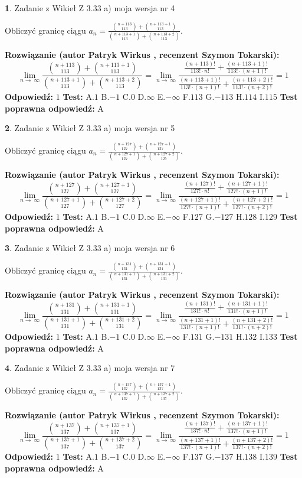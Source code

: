 \documentclass[12pt, a4paper]{article}
\theoremstyle{definition} %
\newtheorem{zad}{}
\newcommand{\zadStart}[1]{\begin{zad}#1\newline}
\newcommand{\zadStop}{\end{zad}}
\newcommand{\rozwStart}[2]{\noindent \textbf{Rozwiązanie (autor #1 , recenzent #2): }\newline}
\newcommand{\rozwStop}{\newline}
\newcommand{\odpStart}{\noindent \textbf{Odpowiedź:}\newline}
\newcommand{\odpStop}{\newline}
\newcommand{\testStart}{\noindent \textbf{Test:}\newline}
\newcommand{\testStop}{\newline}
\newcommand{\kluczStart}{\noindent \textbf{Test poprawna odpowiedź:}\newline}
\newcommand{\kluczStop}{\newline}
\begin{document}
\zadStart{Zadanie z Wikieł Z 3.33 a) moja wersja nr 4}

Obliczyć granicę ciągu $a_{n}=\frac{{n+113\choose113}+{n+113+1\choose113}}{{n+113+1\choose113}+{n+113+2\choose113}}$.
\zadStop
\rozwStart{Patryk Wirkus}{Szymon Tokarski}
$$\lim\limits_{n\to\ \infty}\frac{{n+113\choose113}+{n+113+1\choose113}}{{n+113+1\choose113}+{n+113+2\choose113}} = \lim\limits_{n\to\ \infty}\frac{\frac{(n+113)!}{113! \cdot n!}+\frac{(n+113+1)!}{113! \cdot (n+1)!}}{\frac{(n+113+1)!}{113! \cdot (n+1)!}+\frac{(n+113+2)!}{113! \cdot (n+2)!}} = 1$$
\rozwStop
\odpStart
$1$
\odpStop
\testStart
A.$1$ B.$-1$ C.$0$ D.$\infty$ E.$-\infty$
F.$113$ G.$-113$
H.$114$
I.$115$
\testStop
\kluczStart
A
\kluczStop



\zadStart{Zadanie z Wikieł Z 3.33 a) moja wersja nr 5}

Obliczyć granicę ciągu $a_{n}=\frac{{n+127\choose127}+{n+127+1\choose127}}{{n+127+1\choose127}+{n+127+2\choose127}}$.
\zadStop
\rozwStart{Patryk Wirkus}{Szymon Tokarski}
$$\lim\limits_{n\to\ \infty}\frac{{n+127\choose127}+{n+127+1\choose127}}{{n+127+1\choose127}+{n+127+2\choose127}} = \lim\limits_{n\to\ \infty}\frac{\frac{(n+127)!}{127! \cdot n!}+\frac{(n+127+1)!}{127! \cdot (n+1)!}}{\frac{(n+127+1)!}{127! \cdot (n+1)!}+\frac{(n+127+2)!}{127! \cdot (n+2)!}} = 1$$
\rozwStop
\odpStart
$1$
\odpStop
\testStart
A.$1$ B.$-1$ C.$0$ D.$\infty$ E.$-\infty$
F.$127$ G.$-127$
H.$128$
I.$129$
\testStop
\kluczStart
A
\kluczStop



\zadStart{Zadanie z Wikieł Z 3.33 a) moja wersja nr 6}

Obliczyć granicę ciągu $a_{n}=\frac{{n+131\choose131}+{n+131+1\choose131}}{{n+131+1\choose131}+{n+131+2\choose131}}$.
\zadStop
\rozwStart{Patryk Wirkus}{Szymon Tokarski}
$$\lim\limits_{n\to\ \infty}\frac{{n+131\choose131}+{n+131+1\choose131}}{{n+131+1\choose131}+{n+131+2\choose131}} = \lim\limits_{n\to\ \infty}\frac{\frac{(n+131)!}{131! \cdot n!}+\frac{(n+131+1)!}{131! \cdot (n+1)!}}{\frac{(n+131+1)!}{131! \cdot (n+1)!}+\frac{(n+131+2)!}{131! \cdot (n+2)!}} = 1$$
\rozwStop
\odpStart
$1$
\odpStop
\testStart
A.$1$ B.$-1$ C.$0$ D.$\infty$ E.$-\infty$
F.$131$ G.$-131$
H.$132$
I.$133$
\testStop
\kluczStart
A
\kluczStop



\zadStart{Zadanie z Wikieł Z 3.33 a) moja wersja nr 7}

Obliczyć granicę ciągu $a_{n}=\frac{{n+137\choose137}+{n+137+1\choose137}}{{n+137+1\choose137}+{n+137+2\choose137}}$.
\zadStop
\rozwStart{Patryk Wirkus}{Szymon Tokarski}
$$\lim\limits_{n\to\ \infty}\frac{{n+137\choose137}+{n+137+1\choose137}}{{n+137+1\choose137}+{n+137+2\choose137}} = \lim\limits_{n\to\ \infty}\frac{\frac{(n+137)!}{137! \cdot n!}+\frac{(n+137+1)!}{137! \cdot (n+1)!}}{\frac{(n+137+1)!}{137! \cdot (n+1)!}+\frac{(n+137+2)!}{137! \cdot (n+2)!}} = 1$$
\rozwStop
\odpStart
$1$
\odpStop
\testStart
A.$1$ B.$-1$ C.$0$ D.$\infty$ E.$-\infty$
F.$137$ G.$-137$
H.$138$
I.$139$
\testStop
\kluczStart
A
\kluczStop
\end{document}
